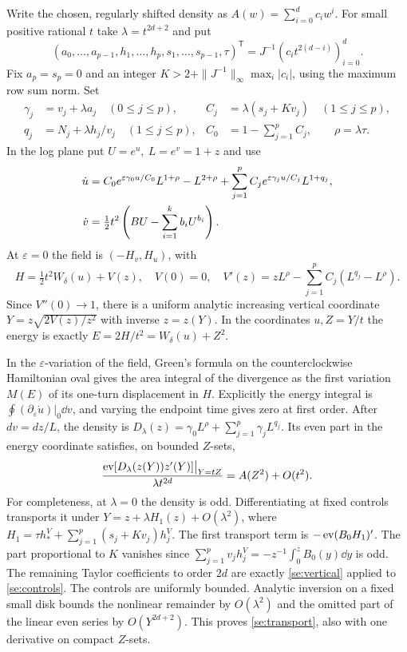 Write the chosen, regularly shifted density as \(A(w)=\sum_{i=0}^d c_i w^i\).
For small positive rational \(t\) take \(\lambda=t^{2d+2}\) and put
\begin{equation}
 (a_0,\ldots,a_{p-1},h_1,\ldots,h_p,s_1,\ldots,s_{p-1},\tau)^{\mathsf T}
 = J^{-1}(c_i t^{2(d-i)})_{i=0}^d .                                \label{se:controls}
\end{equation}
Fix \(a_p=s_p=0\) and an integer
\(K>2+\|J^{-1}\|_\infty\max_i|c_i|\), using the maximum row sum norm.
Set
\begin{align*}
 \gamma_j&=v_j+\lambda a_j\quad(0\le j\le p),&
 C_j&=\lambda(s_j+Kv_j)\quad(1\le j\le p),\\
 q_j&=N_j+\lambda h_j/v_j\quad(1\le j\le p),&
 C_0&=1-\textstyle\sum_{j=1}^p C_j,\qquad \rho=\lambda\tau .
\end{align*}
In the log plane put \(U=e^u,\ L=e^v=1+z\) and use
\begin{align}
 \dot u&=C_0e^{\varepsilon\gamma_0 u/C_0}L^{1+\rho}-L^{2+\rho}
                +\sum_{j=1}^p C_j e^{\varepsilon\gamma_j u/C_j}L^{1+q_j},
                \notag\\
 \dot v&=\tfrac12 t^2 \left(BU-\sum_{i=1}^k b_i U^{b_i}\right).       \label{se:logfield}
\end{align}
At \(\varepsilon=0\) the field is \((-H_v,H_u)\), with
\[
 H=\tfrac12 t^2W_\delta(u)+V(z),\quad V(0)=0,\quad
 V'(z)=zL^\rho-\sum_{j=1}^p C_j(L^{q_j}-L^\rho).
\]
Since \(V''(0)\to1\), there is a uniform analytic increasing vertical
coordinate \(Y=z\sqrt{2V(z)/z^2}\) with inverse \(z=z(Y)\).
In the coordinates \(u,Z=Y/t\) the energy is exactly
\(E=2H/t^2=W_\delta(u)+Z^2\).

In the \(\varepsilon\)-variation of the field, Green's formula on the
counterclockwise Hamiltonian oval gives the area integral of the divergence
as the first variation \(M(E)\) of its one-turn displacement in \(H\).
Explicitly the energy integral is \(\oint(\partial_\varepsilon\dot u)|_0
\dd v\), and varying the endpoint time gives zero at first order.
After \(dv=dz/L\), the density is
\(D_\lambda(z)=\gamma_0L^\rho+\sum_{j=1}^p\gamma_j L^{q_j}\).
Its even part in the energy coordinate satisfies, on bounded \(Z\)-sets,
\begin{equation}
 \frac{\operatorname{ev}[D_\lambda(z(Y))z'(Y)]\big|_{Y=tZ}}{\lambda t^{2d}}
                    =A(Z^2)+O(t^2).                                  \label{se:transport}
\end{equation}
For completeness, at \(\lambda=0\) the density is odd. Differentiating
at fixed controls transports it under
\(Y=z+\lambda H_1(z)+O(\lambda^2)\), where
\(H_1=\tau h_*^V+\sum_{j=1}^p(s_j+Kv_j)h_j^V\).
The first transport term is \(-\operatorname{ev}(B_0H_1)'\).
The part proportional to \(K\) vanishes since
\(\sum_{j=1}^p v_j h_j^V=-z^{-1}\int_0^z B_0(y)\dd y\) is odd.
The remaining Taylor coefficients to order \(2d\) are exactly
\eqref{se:vertical} applied to \eqref{se:controls}. The controls are uniformly
bounded. Analytic inversion on a fixed small disk bounds the nonlinear
remainder by \(O(\lambda^2)\) and the omitted part of the linear even
series by \(O(Y^{2d+2})\). This proves \eqref{se:transport}, also with
one derivative on compact \(Z\)-sets.

